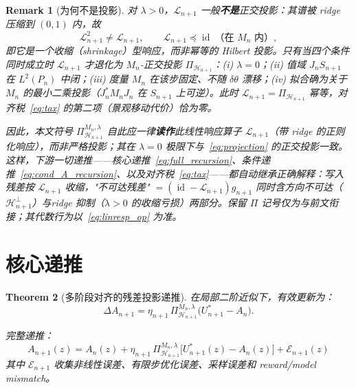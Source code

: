 \documentclass[11pt,a4paper]{article}
\newtheorem{theorem}{Theorem}[section]
\newtheorem{remark}[theorem]{Remark}
\DeclareMathOperator{\id}{id}
\newcommand{\cL}{\mathcal{L}}
\newcommand{\cH}{\mathcal{H}}
\newcommand{\cE}{\mathcal{E}}
\newcommand{\ProjectOp}{\Pi}
\begin{document}
\begin{remark}[为何不是投影]\label{rem:linresp_proj}
对 $\lambda>0$，$\cL_{n+1}$ 一般\textbf{不是}正交投影：其谱被 ridge 压缩到 $(0,1)$ 内，故
\begin{equation*}
\cL_{n+1}^2 \neq \cL_{n+1},\qquad \cL_{n+1}\preceq \id\ \text{（在 }M_n\text{ 内）},
\end{equation*}
即它是一个收缩（shrinkage）型响应，而非幂等的 Hilbert 投影。只有当四个条件同时成立时 $\cL_{n+1}$ 才退化为 $M_n$-正交投影 $\ProjectOp_{\cH_{n+1}}$：(i) $\lambda=0$；(ii) 值域 $J_n S_{n+1}$ 在 $L^2(P_n)$ 中闭；(iii) 度量 $M_n$ 在该步固定、不随 $\delta\theta$ 漂移；(iv) 拟合确为关于 $M_n$ 的最小二乘投影（$J_n^{\!*}M_n J_n$ 在 $S_{n+1}$ 上可逆）。此时 $\cL_{n+1}=\ProjectOp_{\cH_{n+1}}$ 幂等，对齐税~\eqref{eq:tax} 的第二项（景观移动代价）恰为零。

因此，本文符号 $\ProjectOp^{M_n,\lambda}_{\cH_{n+1}}$ 自此应一律\textbf{读作}此线性响应算子 $\cL_{n+1}$（带 ridge 的正则化响应），而非严格投影；其在 $\lambda=0$ 极限下与~\eqref{eq:projection} 的正交投影一致。这样，下游一切递推——核心递推~\eqref{eq:full_recursion}、条件递推~\eqref{eq:cond_A_recursion}、以及对齐税~\eqref{eq:tax}——都自动继承正确解释：写入残差按 $\cL_{n+1}$ 收缩，"不可达残差" $=(\id-\cL_{n+1})g_{n+1}$ 同时含\emph{方向不可达}（$\cH_{n+1}^\perp$）与\emph{ridge 抑制}（$\lambda>0$ 的收缩亏损）两部分。保留 $\ProjectOp$ 记号仅为与前文衔接；其代数行为以~\eqref{eq:linresp_op} 为准。
\end{remark}

\section{核心递推}
\label{sec:recursion}

\begin{theorem}[多阶段对齐的残差投影递推]\label{thm:recursion}
在局部二阶近似下，有效更新为：
\begin{equation}\label{eq:update}
\Delta A_{n+1} = \eta_{n+1}\,\ProjectOp_{\cH_{n+1}}^{M_n,\lambda}\!\bigl(U_{n+1}^* - A_n\bigr).
\end{equation}

完整递推：
\begin{equation}\label{eq:full_recursion}
\boxed{
A_{n+1}(z) = A_n(z) + \eta_{n+1}\,\ProjectOp_{\cH_{n+1}}^{M_n,\lambda}\!\bigl[U_{n+1}^*(z) - A_n(z)\bigr] + \cE_{n+1}(z)
}
\end{equation}
其中 $\cE_{n+1}$ 收集非线性误差、有限步优化误差、采样误差和 reward/model mismatch。
\end{theorem}
\end{document}
